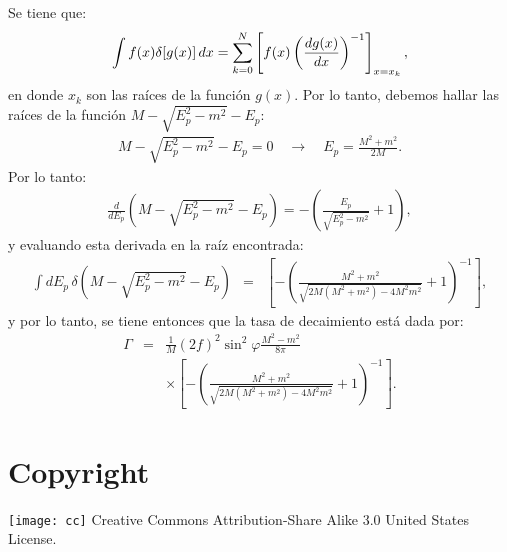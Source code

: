 Se tiene que:
\begin{eqnarray*}
\int f(x)\delta[g(x)]\,dx=\sum_{k=0}^N\left[f(x)\left(\frac{dg(x)}{dx}\right)^{-1}\right]_{x=x_k},
\end{eqnarray*}
en donde $x_k$ son las raíces de la función $g(x)$. Por lo tanto, debemos hallar las raíces de la función
$M-\sqrt{E_p^2-m^2}-E_p$:
\begin{eqnarray*}
M-\sqrt{E_p^2-m^2}-E_p=0 \quad \rightarrow \quad E_p=\frac{M^2+m^2}{2M}.
\end{eqnarray*}
Por lo tanto:
\begin{eqnarray*}
\frac{d}{dE_p}\left(M-\sqrt{E_p^2-m^2}-E_p\right)=-\left(\frac{E_p}{\sqrt{E_p^2-m^2}}+1\right),
\end{eqnarray*}
y evaluando esta derivada en la raíz encontrada:
\begin{eqnarray*}
\int dE_p\,\delta(M-\sqrt{E_p^2-m^2}-E_p)&=&\left[-\left(\frac{M^2+m^2}{\sqrt{2M(M^2+m^2)-4M^2m^2}}+1\right)^{-1}\right],
\end{eqnarray*}
y por lo tanto, se tiene entonces que la tasa de decaimiento está dada por:
\begin{eqnarray}\label{tasa-decaimiento-total}
\Gamma&=&\frac{1}{M}(2f)^2\sin^2\varphi\frac{M^2-m^2}{8\pi} \nonumber \\
& &\times\left[-\left(\frac{M^2+m^2}{\sqrt{2M(M^2+m^2)-4M^2m^2}}+1\right)^{-1} \right].
\end{eqnarray}

\section{Copyright}
\texttt{[image: cc]} Creative Commons Attribution-Share Alike 3.0 United States License.


